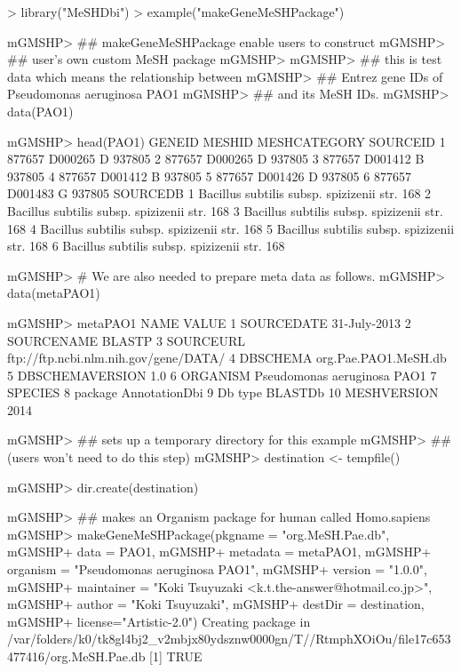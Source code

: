 \documentclass[11pt]{article}
\begin{document}
\begin{center}
\begin{Schunk}
\begin{Sinput}
> library("MeSHDbi")
> example("makeGeneMeSHPackage")
\end{Sinput}
\begin{Soutput}
mGMSHP> ## makeGeneMeSHPackage enable users to construct
mGMSHP> ## user's own custom MeSH package
mGMSHP> 
mGMSHP> ## this is test data which means the relationship between
mGMSHP> ## Entrez gene IDs of Pseudomonas aeruginosa PAO1
mGMSHP> ## and its MeSH IDs.
mGMSHP> data(PAO1)

mGMSHP> head(PAO1)
  GENEID  MESHID MESHCATEGORY SOURCEID
1 877657 D000265            D   937805
2 877657 D000265            D   937805
3 877657 D001412            B   937805
4 877657 D001412            B   937805
5 877657 D001426            D   937805
6 877657 D001483            G   937805
                                      SOURCEDB
1 Bacillus subtilis subsp. spizizenii str. 168
2 Bacillus subtilis subsp. spizizenii str. 168
3 Bacillus subtilis subsp. spizizenii str. 168
4 Bacillus subtilis subsp. spizizenii str. 168
5 Bacillus subtilis subsp. spizizenii str. 168
6 Bacillus subtilis subsp. spizizenii str. 168

mGMSHP> # We are also needed to prepare meta data as follows.
mGMSHP> data(metaPAO1)

mGMSHP> metaPAO1
              NAME                                 VALUE
1       SOURCEDATE                          31-July-2013
2       SOURCENAME                                BLASTP
3        SOURCEURL ftp://ftp.ncbi.nlm.nih.gov/gene/DATA/
4         DBSCHEMA                  org.Pae.PAO1.MeSH.db
5  DBSCHEMAVERSION                                   1.0
6         ORGANISM           Pseudomonas aeruginosa PAO1
7          SPECIES                                      
8          package                         AnnotationDbi
9          Db type                               BLASTDb
10     MESHVERSION                                  2014

mGMSHP> ## sets up a temporary directory for this example
mGMSHP> ## (users won't need to do this step)
mGMSHP> destination <- tempfile()

mGMSHP> dir.create(destination)

mGMSHP> ## makes an Organism package for human called Homo.sapiens
mGMSHP> makeGeneMeSHPackage(pkgname = "org.MeSH.Pae.db",
mGMSHP+ 					data = PAO1,
mGMSHP+           metadata = metaPAO1,
mGMSHP+ 					organism = "Pseudomonas aeruginosa PAO1",
mGMSHP+ 					version = "1.0.0",
mGMSHP+ 					maintainer = "Koki Tsuyuzaki <k.t.the-answer@hotmail.co.jp>",
mGMSHP+ 					author = "Koki Tsuyuzaki",
mGMSHP+ 					destDir = destination,
mGMSHP+ 					license="Artistic-2.0")
Creating package in /var/folders/k0/tk8gl4bj2_v2mbjx80ydsznw0000gn/T//RtmphXOiOu/file17c653477416/org.MeSH.Pae.db 
[1] TRUE
\end{Soutput}
\end{Schunk}
\end{center}
\end{document}
